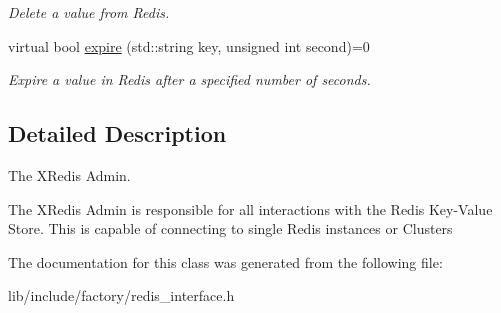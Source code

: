 \begin{DoxyCompactItemize}
\begin{DoxyCompactList}\small\item\em Delete a value from Redis. \end{DoxyCompactList}\item 
\hypertarget{classRedisInterface_a1bccb873c675701ce5f9c828067ba37f}{virtual bool \hyperlink{classRedisInterface_a1bccb873c675701ce5f9c828067ba37f}{expire} (std\-::string key, unsigned int second)=0}\label{classRedisInterface_a1bccb873c675701ce5f9c828067ba37f}

\begin{DoxyCompactList}\small\item\em Expire a value in Redis after a specified number of seconds. \end{DoxyCompactList}\end{DoxyCompactItemize}


\subsection{Detailed Description}
The X\-Redis Admin. 

The X\-Redis Admin is responsible for all interactions with the Redis Key-\/\-Value Store. This is capable of connecting to single Redis instances or Clusters 

The documentation for this class was generated from the following file\-:\begin{DoxyCompactItemize}
\item 
lib/include/factory/redis\-\_\-interface.\-h\end{DoxyCompactItemize}
